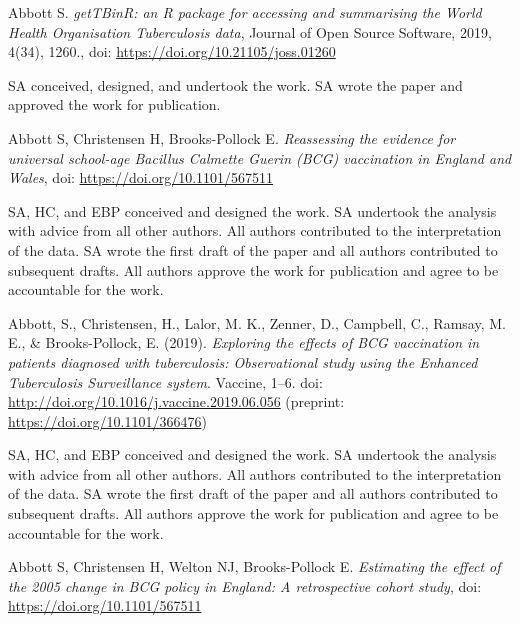 \documentclass[11pt,twoside]{bristolthesis}
\begin{document}
      \begin{contribution}
      Abbott S. \emph{getTBinR: an R package for accessing and summarising the World Health Organisation Tuberculosis data}, Journal of Open Source Software, 2019, 4(34), 1260., doi: \url{https://doi.org/10.21105/joss.01260}
      
      \par
      
      SA conceived, designed, and undertook the work. SA wrote the paper and approved the work for publication.
      
      \par
      
      Abbott S, Christensen H, Brooks-Pollock E. \emph{Reassessing the evidence for universal school-age Bacillus Calmette Guerin (BCG) vaccination in England and Wales}, doi: \url{https://doi.org/10.1101/567511}
      
      \par
      
      SA, HC, and EBP conceived and designed the work. SA undertook the analysis with advice from all other authors. All authors contributed to the interpretation of the data. SA wrote the first draft of the paper and all authors contributed to subsequent drafts. All authors approve the work for publication and agree to be accountable for the work.
      
      \par
      
      Abbott, S., Christensen, H., Lalor, M. K., Zenner, D., Campbell, C., Ramsay, M. E., \& Brooks-Pollock, E. (2019). \emph{Exploring the effects of BCG vaccination in patients diagnosed with tuberculosis: Observational study using the Enhanced Tuberculosis Surveillance system}. Vaccine, 1--6. doi: \url{http://doi.org/10.1016/j.vaccine.2019.06.056} (preprint: \url{https://doi.org/10.1101/366476})
      
      \par
      
      SA, HC, and EBP conceived and designed the work. SA undertook the analysis with advice from all other authors. All authors contributed to the interpretation of the data. SA wrote the first draft of the paper and all authors contributed to subsequent drafts. All authors approve the work for publication and agree to be accountable for the work.
      
      \par
      
      Abbott S, Christensen H, Welton NJ, Brooks-Pollock E. \emph{Estimating the effect of the 2005 change in BCG policy in England: A retrospective cohort study}, doi: \url{https://doi.org/10.1101/567511}
      

\end{contribution}
\end{document}
